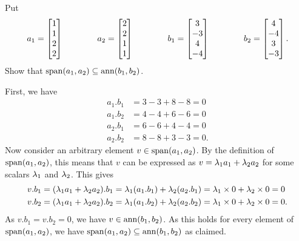 \documentclass[a4paper]{amsart}
\renewenvironment{solution}{\SolutionInline}{\endSolutionInline}
\begin{document}
\begin{exercise}\label{ex-span-in-ann}
 Put 
 \[ a_1 = \left[\begin{matrix} 1 \\ 1 \\ 2 \\ 2 \end{matrix}\right] \hspace{4em}
    a_2 = \left[\begin{matrix} 2 \\ 2 \\ 1 \\ 1 \end{matrix}\right] \hspace{4em}
    b_1 = \left[\begin{matrix} 3 \\ -3 \\ 4 \\ -4 \end{matrix}\right] \hspace{4em}
    b_2 = \left[\begin{matrix} 4 \\ -4 \\ 3 \\ -3 \end{matrix}\right].
 \] 
 Show that $\operatorname{span}(a_1,a_2)\subseteq\operatorname{ann}(b_1,b_2)$.
\end{exercise}
\begin{solution}
 First, we have
 \begin{align*}
  a_1.b_1 &= 3-3+8-8 = 0 \\
  a_1.b_2 &= 4-4+6-6 = 0 \\
  a_2.b_1 &= 6-6+4-4 = 0 \\
  a_2.b_2 &= 8-8+3-3 = 0.
 \end{align*}
 Now consider an arbitrary element $v\in\operatorname{span}(a_1,a_2)$.  By the
 definition of $\operatorname{span}(a_1,a_2)$, this means that $v$ can be expressed
 as $v=\lambda_1a_1+\lambda_2a_2$ for some scalars $\lambda_1$ and $\lambda_2$.  This
 gives 
 \begin{align*}
  v.b_1 &= (\lambda_1a_1+\lambda_2a_2).b_1 = 
           \lambda_1(a_1.b_1) + \lambda_2 (a_2.b_1) = 
           \lambda_1\times 0 + \lambda_2\times 0 = 0 \\
  v.b_2 &= (\lambda_1a_1+\lambda_2a_2).b_2 = 
           \lambda_1(a_1.b_2) + \lambda_2 (a_2.b_2) = 
           \lambda_1\times 0 + \lambda_2\times 0 = 0.
 \end{align*}
 As $v.b_1=v.b_2=0$, we have $v\in\operatorname{ann}(b_1,b_2)$.  As this holds for
 every element of $\operatorname{span}(a_1,a_2)$, we have
 $\operatorname{span}(a_1,a_2)\subseteq\operatorname{ann}(b_1,b_2)$ as claimed.
\end{solution}
\end{document}
